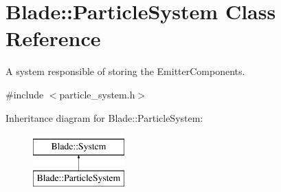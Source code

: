 \hypertarget{class_blade_1_1_particle_system}{}\section{Blade\+:\+:Particle\+System Class Reference}
\label{class_blade_1_1_particle_system}


A system responsible of storing the Emitter\+Components.  




{\ttfamily \#include $<$particle\+\_\+system.\+h$>$}

Inheritance diagram for Blade\+:\+:Particle\+System\+:\begin{figure}[H]
\begin{center}
\leavevmode
\includegraphics[height=2.000000cm]{class_blade_1_1_particle_system}
\end{center}
\end{figure}
